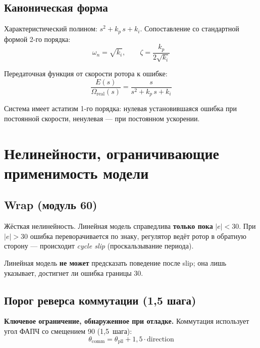 \documentclass[12pt,a4paper]{article}
\begin{document}
\subsection{Каноническая форма}

Характеристический полином: $s^2 + k_p \, s + k_i$.
Сопоставление со стандартной формой 2-го порядка:
\begin{equation}
  \boxed{\omega_n = \sqrt{k_i}, \qquad
         \zeta = \frac{k_p}{2\sqrt{k_i}}}
  \label{eq:canonical}
\end{equation}

Передаточная функция от скорости ротора к ошибке:
\begin{equation}
  \frac{E(s)}{\Omega_\text{real}(s)} = \frac{s}{s^2 + k_p \, s + k_i}
  \label{eq:tf}
\end{equation}

Система имеет астатизм 1-го порядка: нулевая установившаяся ошибка
при постоянной скорости, ненулевая --- при постоянном ускорении.

\section{Нелинейности, ограничивающие применимость модели}

\subsection{Wrap (модуль 60)}

Жёсткая нелинейность. Линейная модель справедлива \textbf{только пока}
$|e| < 30$. При $|e| > 30$ ошибка переворачивается по знаку, регулятор
ведёт ротор в обратную сторону --- происходит \emph{cycle slip}
(проскальзывание периода).

Линейная модель \textbf{не может} предсказать поведение после slip;
она лишь указывает, достигнет ли ошибка границы 30.

\subsection{Порог реверса коммутации (1{,}5 шага)}
\label{sec:reversal}

\textbf{Ключевое ограничение, обнаруженное при отладке.}
Коммутация использует угол ФАПЧ со смещением 90\textdegree{}
(1{,}5~шага):
\begin{equation*}
  \theta_\text{comm} = \theta_\text{pll} + 1{,}5 \cdot \text{direction}
\end{equation*}
\end{document}
